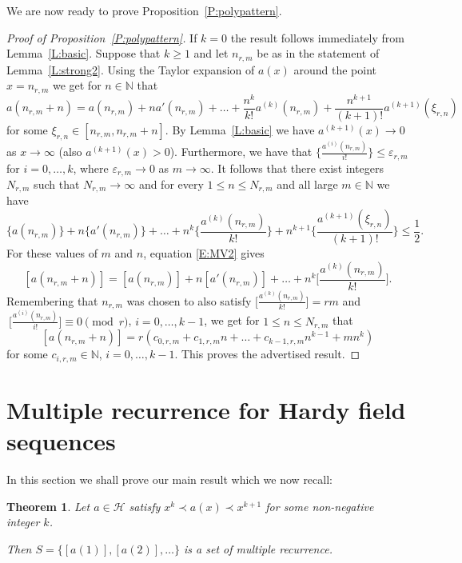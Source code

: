 \documentclass[11pt]{amsart}
\renewcommand{\H}{\mathcal{H}}
\newcommand{\N}{\mathbb{N}}
\theoremstyle{plain}
\newtheorem{theorem}{Theorem}[section]
\theoremstyle{definition}
\theoremstyle{remark}
\begin{document}
We are now ready to prove Proposition~\ref{P:polypattern}.
\begin{proof}[Proof of Proposition~\ref{P:polypattern}]
If $k=0$ the result follows immediately from Lemma~\ref{L:basic}.
Suppose that $k\geq 1$ and
  let $n_{r,m}$ be as in the statement of Lemma~\ref{L:strong2}.
  Using the Taylor expansion of $a(x)$ around the point $x=n_{r,m}$ we get for $n\in\N$ that
  \begin{equation}\label{E:MV2}
    a(n_{r,m}+n)=a(n_{r,m})+na'(n_{r,m})+\ldots+\frac{n^k}{k!}a^{(k)}(n_{r,m})+
    \frac{n^{k+1}}{(k+1)!}a^{(k+1)}(\xi_{r,n})
  \end{equation}
  for some $\xi_{r,n}\in [n_{r,m},n_{r,m}+n]$. By Lemma~\ref{L:basic}
  we have $a^{(k+1)}(x)\to 0$ as $x\to\infty$ (also $a^{(k+1)}(x)>0$).
Furthermore,    we have  that
  $\Big\{\frac{a^{(i)}(n_{r,m})}{i!}\Big\}\leq \varepsilon_{r,m}$ for
  $ i=0,\ldots,k$, where $ \varepsilon_{r,m}\to 0$ as $m\to\infty$.
  It follows that there exist integers $N_{r,m}$ such that
  $N_{r,m}\to\infty$ and for every $1\leq n\leq N_{r,m}$ and all large
   $m\in \N$ we have
$$
\{a(n_{r,m})\}+n\{a'(n_{r,m})\}+\ldots+n^k\Big\{\frac{a^{(k)}(n_{r,m})}{k!}\Big\}+
n^{k+1}\Big\{\frac{a^{(k+1)}(\xi_{r,n})}{(k+1)!}\Big\}
\leq \frac{1}{2}.
$$
For these values of $m$ and $n$, equation \eqref{E:MV2} gives
$$
[a(n_{r,m}+n)]=[a(n_{r,m})]+n[a'(n_{r,m})]+\ldots+n^k\Big[\frac{a^{(k)}(n_{r,m})}{k!}\Big].
$$
Remembering that $n_{r,m}$ was chosen to also satisfy
$\Big[\frac{a^{(k)}(n_{r,m})}{k!}\Big]=rm$ and $\
\Big[\frac{a^{(i)}(n_{r,m})}{i!}\Big]\equiv 0 \!\!\pmod{r}$,
$i=0,\ldots,k-1$, we get for $1\leq n\leq N_{r,m}$ that
$$
[a(n_{r,m}+n)]= r(c_{0,r,m}+c_{1,r,m}n+\ldots+c_{k-1,r,m}n^{k-1}+mn^k)
$$
for some $c_{i,r,m}\in\N$, $i=0,\ldots,k-1$. This proves the
advertised result.
\end{proof}

\section{Multiple recurrence for  Hardy field sequences}\label{S:mainpart}
In this section we shall prove our main result which we now recall:
\begin{theorem}
  Let $a\in\H$ satisfy $x^k\prec a(x) \prec x^{k+1}$ for some non-negative
  integer $k$.

  Then $S=\{[a(1)],[a(2)],\ldots\}$ is a set of multiple recurrence.
\end{theorem}
\end{document}
